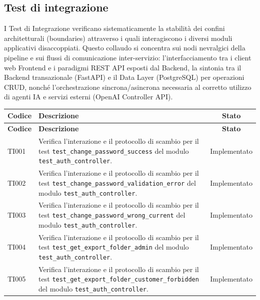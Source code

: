 \documentclass[a4paper,11pt,oneside]{scrartcl}
\begin{document}
\subsection{Test di integrazione}
I Test di Integrazione verificano sistematicamente la stabilità dei confini architetturali (boundaries) attraverso i quali interagiscono i diversi moduli applicativi disaccoppiati. Questo collaudo si concentra sui nodi nevralgici della pipeline e sui flussi di comunicazione inter-servizio: l'interfacciamento tra i client web Frontend e i paradigmi REST API esposti dal Backend, la sintonia tra il Backend transazionale (FastAPI) e il Data Layer (PostgreSQL) per operazioni CRUD, nonché l'orchestrazione sincrona/asincrona necessaria al corretto utilizzo di agenti IA e servizi esterni (OpenAI Controller API).
\begin{longtable}{|p{1.9cm}|p{11.6cm}|c|}
    \hline
    \rowcolor[gray]{0.9}
    \textbf{Codice} & \textbf{Descrizione}                                                                                                                                                                                       & \textbf{Stato} \\
    \hline
    \endfirsthead
    \hline
    \rowcolor[gray]{0.9}
    \textbf{Codice} & \textbf{Descrizione}                                                                                                                                                                                       & \textbf{Stato} \\
    \hline
    \endhead
        TI001 & Verifica l'interazione e il protocollo di scambio per il test \texttt{test\_change\_password\_success} del modulo \texttt{test\_auth\_controller}. & Implementato \\ \hline
    TI002 & Verifica l'interazione e il protocollo di scambio per il test \texttt{test\_change\_password\_validation\_error} del modulo \texttt{test\_auth\_controller}. & Implementato \\ \hline
    TI003 & Verifica l'interazione e il protocollo di scambio per il test \texttt{test\_change\_password\_wrong\_current} del modulo \texttt{test\_auth\_controller}. & Implementato \\ \hline
    TI004 & Verifica l'interazione e il protocollo di scambio per il test \texttt{test\_get\_export\_folder\_admin} del modulo \texttt{test\_auth\_controller}. & Implementato \\ \hline
    TI005 & Verifica l'interazione e il protocollo di scambio per il test \texttt{test\_get\_export\_folder\_customer\_forbidden} del modulo \texttt{test\_auth\_controller}. & Implementato \\ \hline

\end{longtable}
\end{document}
